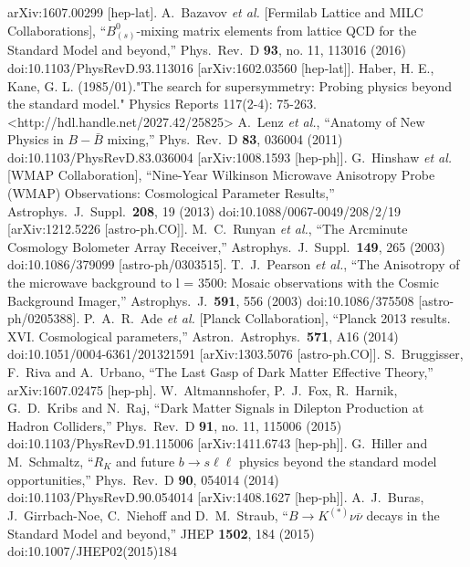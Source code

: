 \begin{thebibliography}{xxx}
  arXiv:1607.00299 [hep-lat]. 
  A.~Bazavov {\it et al.} [Fermilab Lattice and MILC Collaborations],
  ``$B^0_{(s)}$-mixing matrix elements from lattice QCD for the Standard Model and beyond,''
  Phys.\ Rev.\ D {\bf 93}, no. 11, 113016 (2016)
  doi:10.1103/PhysRevD.93.113016
  [arXiv:1602.03560 [hep-lat]].
  Haber, H. E., Kane, G. L. (1985/01)."The search for supersymmetry: Probing physics beyond the standard model." Physics Reports 117(2-4): 75-263. <http://hdl.handle.net/2027.42/25825>
  A.~Lenz {\it et al.},
  ``Anatomy of New Physics in $B - \bar{B}$ mixing,''
  Phys.\ Rev.\ D {\bf 83}, 036004 (2011)
  doi:10.1103/PhysRevD.83.036004
  [arXiv:1008.1593 [hep-ph]]. 
  G.~Hinshaw {\it et al.} [WMAP Collaboration],
  ``Nine-Year Wilkinson Microwave Anisotropy Probe (WMAP) Observations: Cosmological Parameter Results,''
  Astrophys.\ J.\ Suppl.\  {\bf 208}, 19 (2013)
  doi:10.1088/0067-0049/208/2/19
  [arXiv:1212.5226 [astro-ph.CO]].
   M.~C.~Runyan {\it et al.},
  ``The Arcminute Cosmology Bolometer Array Receiver,''
  Astrophys.\ J.\ Suppl.\  {\bf 149}, 265 (2003)
  doi:10.1086/379099
  [astro-ph/0303515].
   T.~J.~Pearson {\it et al.},
  ``The Anisotropy of the microwave background to l = 3500: Mosaic observations with the Cosmic Background Imager,''
  Astrophys.\ J.\  {\bf 591}, 556 (2003)
  doi:10.1086/375508
  [astro-ph/0205388].
   P.~A.~R.~Ade {\it et al.} [Planck Collaboration],
  ``Planck 2013 results. XVI. Cosmological parameters,''
  Astron.\ Astrophys.\  {\bf 571}, A16 (2014)
  doi:10.1051/0004-6361/201321591
  [arXiv:1303.5076 [astro-ph.CO]].
    S.~Bruggisser, F.~Riva and A.~Urbano,
  ``The Last Gasp of Dark Matter Effective Theory,''
  arXiv:1607.02475 [hep-ph].
    W.~Altmannshofer, P.~J.~Fox, R.~Harnik, G.~D.~Kribs and N.~Raj,
  ``Dark Matter Signals in Dilepton Production at Hadron Colliders,''
  Phys.\ Rev.\ D {\bf 91}, no. 11, 115006 (2015)
  doi:10.1103/PhysRevD.91.115006
  [arXiv:1411.6743 [hep-ph]].
    G.~Hiller and M.~Schmaltz,
  ``$R_K$ and future $b \to s \ell \ell$ physics beyond the standard model opportunities,''
  Phys.\ Rev.\ D {\bf 90}, 054014 (2014)
  doi:10.1103/PhysRevD.90.054014
  [arXiv:1408.1627 [hep-ph]].
  A.~J.~Buras, J.~Girrbach-Noe, C.~Niehoff and D.~M.~Straub,
  ``$ B\to {K}^{\left(\ast \right)}\nu \overline{\nu} $ decays in the Standard Model and beyond,''
  JHEP {\bf 1502}, 184 (2015)
  doi:10.1007/JHEP02(2015)184

\end{thebibliography}
